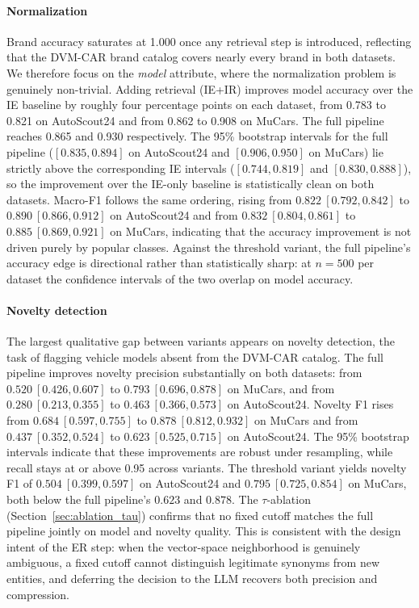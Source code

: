 \documentclass[conference]{IEEEtran}
\begin{document}
\paragraph{Normalization}
Brand accuracy saturates at 1.000 once any
retrieval step is introduced, reflecting that the DVM-CAR brand
catalog covers nearly every brand in both datasets.
We therefore focus on the \textit{model} attribute, where the
normalization problem is genuinely non-trivial. Adding retrieval
(IE+IR) improves model accuracy over the IE baseline by roughly four
percentage points on each dataset, from 0.783 to 0.821 on AutoScout24
and from 0.862 to 0.908 on MuCars. The full pipeline reaches
0.865 and 0.930 respectively. The 95\% bootstrap intervals
for the full pipeline ($[0.835, 0.894]$ on AutoScout24 and $[0.906,
0.950]$ on MuCars) lie strictly above the corresponding IE intervals
($[0.744, 0.819]$ and $[0.830, 0.888]$), so the improvement over the
IE-only baseline is statistically clean on both datasets. Macro-F1
follows the same ordering, rising from $0.822~[0.792, 0.842]$ to
$0.890~[0.866, 0.912]$ on AutoScout24 and from $0.832~[0.804, 0.861]$
to $0.885~[0.869, 0.921]$ on MuCars, indicating that the accuracy
improvement is not driven purely by popular classes. Against the threshold
variant, the full pipeline's accuracy edge is directional rather than
statistically sharp: at $n = 500$ per dataset the confidence
intervals of the two overlap on model accuracy.

\paragraph{Novelty detection}
The largest qualitative gap between
variants appears on novelty detection, the task of flagging vehicle
models absent from the DVM-CAR catalog. The full pipeline improves
novelty precision substantially on both datasets: from $0.520~
[0.426, 0.607]$ to $0.793~[0.696, 0.878]$ on MuCars, and from
$0.280~[0.213, 0.355]$ to $0.463~[0.366, 0.573]$ on AutoScout24.
Novelty F1 rises from $0.684~[0.597, 0.755]$ to $0.878~[0.812,
0.932]$ on MuCars and from $0.437~[0.352, 0.524]$ to $0.623~[0.525,
0.715]$ on AutoScout24. The 95\% bootstrap intervals indicate that
these improvements are robust under resampling, while recall stays at or
above 0.95 across variants. The threshold variant yields novelty F1
of $0.504~[0.399, 0.597]$ on AutoScout24 and $0.795~[0.725, 0.854]$
on MuCars, both below the full pipeline's $0.623$ and $0.878$.
The $\tau$-ablation (Section~\ref{sec:ablation_tau}) confirms that no
fixed cutoff matches the full pipeline jointly on model and novelty
quality. This is consistent with the design intent of the ER
step: when the vector-space neighborhood is genuinely ambiguous, a
fixed cutoff cannot distinguish legitimate synonyms from new entities,
and deferring the decision to the LLM recovers both precision and
compression.
\end{document}
